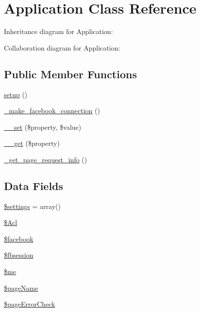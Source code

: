 \hypertarget{classApplication}{
\section{Application Class Reference}
\label{classApplication}
}


Inheritance diagram for Application:


Collaboration diagram for Application:
\subsection*{Public Member Functions}
\begin{DoxyCompactItemize}
\item 
\hyperlink{classApplication_a1d04139db3a5ad5713ecbd14d97da879}{setup} ()
\item 
\hyperlink{classApplication_ab2e18c82d6909c852402b07aa48340bc}{\_\-make\_\-facebook\_\-connection} ()
\item 
\hyperlink{classApplication_a9b7f2b58fa3c9e81f142efb424433163}{\_\-\_\-set} (\$property, \$value)
\item 
\hyperlink{classApplication_a6481e8cfc93c80885b3d72a6e1f15a1f}{\_\-\_\-get} (\$property)
\item 
\hyperlink{classApplication_a00b869b4eabdea57875bbde42e283115}{\_\-get\_\-page\_\-request\_\-info} ()
\end{DoxyCompactItemize}
\subsection*{Data Fields}
\begin{DoxyCompactItemize}
\item 
\hyperlink{classApplication_ac7c3353107070daa85f641882931b358}{\$settings} = array()
\item 
\hyperlink{classApplication_aa06e64fd19a6d82d290ec197a8e65148}{\$Acl}
\item 
\hyperlink{classApplication_a4b9bb5e9f7a5ea9381bdbe31c44e9339}{\$facebook}
\item 
\hyperlink{classApplication_a92c4441a7b5fe8069992f5a4a29f24fe}{\$fbsession}
\item 
\hyperlink{classApplication_ad856a60cee1894f180e845f9b7b81458}{\$me}
\item 
\hyperlink{classApplication_a6ca08dfcc239ba6bbe209515c2d3aec7}{\$pageName}
\item 
\hyperlink{classApplication_ae82828f1344d1f882b81bb010cb9f17b}{\$pageErrorCheck}
\end{DoxyCompactItemize}
